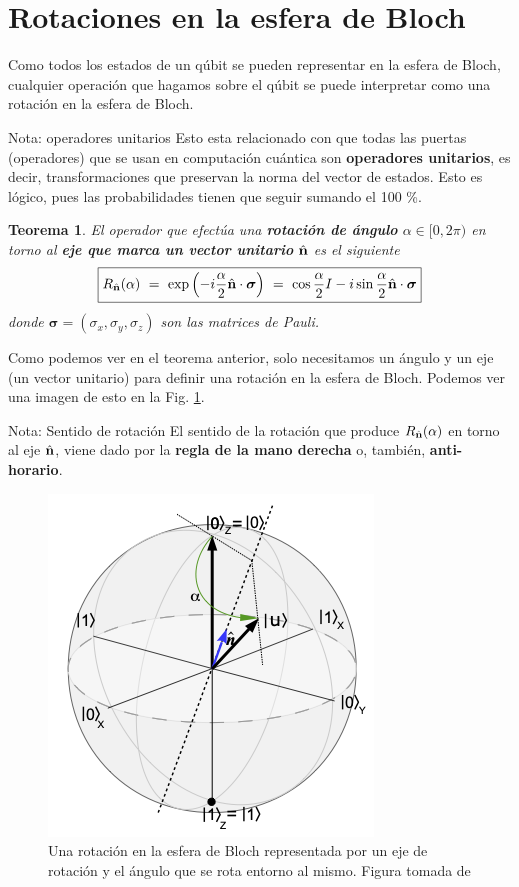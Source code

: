 \documentclass[a4paper,11pt]{book} %
\newtheorem{teorema_contador}{Teorema}
\newcommand{\Teorema}[1]{
		\begin{mybox_gray2}{}
			\begin{teorema_contador}
				 #1 
			\end{teorema_contador} 
		\end{mybox_gray2}
	}
\numberwithin{equation}{chapter}
\begin{document}
    \section{Rotaciones en la esfera de Bloch}

Como todos los estados de un qúbit se pueden representar en la esfera de Bloch, cualquier operación que hagamos sobre el qúbit se puede interpretar como una rotación en la esfera de Bloch.

	\begin{mybox_blue}{Nota: operadores unitarios}
	Esto esta relacionado con que todas las puertas (operadores) que se usan en computación cuántica son 
	\textbf{operadores unitarios}, es decir, transformaciones que preservan la norma
	del vector de estados. Esto es lógico, pues las probabilidades tienen que seguir 
	sumando el 100 \%. 
	\end{mybox_blue}
	

	\Teorema{
	El operador que efectúa una \textbf{rotación de ángulo}  $\alpha\in [0,2\pi)$ en torno al 
	\textbf{eje que marca un vector unitario} $\hat{\bf n}$ es el siguiente
	\begin{equation} \label{ec_puertas_simples_Rn}
	\boxed{R_{\hat{\bf n}}(\alpha)~ = ~\exp\left( -i\frac{\alpha}{2} \hat{\bf n}\cdot 
	\boldsymbol{\sigma} \right) ~=~ \cos \frac{\alpha}{2} I - i \sin\frac{\alpha}{2} 
	\hat{\bf n}\cdot\boldsymbol{\sigma} }
	\end{equation}
	donde $\boldsymbol{\sigma} = (\sigma_x, \sigma_y, \sigma_z)$ son las matrices de Pauli.
	}
	
Como podemos ver en el teorema anterior, solo necesitamos un ángulo y un eje (un vector unitario) para definir una rotación en la esfera de Bloch. Podemos ver una imagen de esto en la Fig. \ref{Fig_puertas_simples_BlochSphere_rot.png}. 


	\begin{mybox_blue}{Nota: Sentido de rotación}
	El sentido de la rotación que produce $R_{\hat{\bf n}}(\alpha)$ en torno al eje 
	$\hat{\bf n}$, viene dado por la \textbf{regla de la mano derecha} o, también, 
	\textbf{anti-horario}. 
	\end{mybox_blue}

	\begin{figure}[H]
	\centering 
	\includegraphics[width=0.3\linewidth]{Figuras/Fig_puertas_simples_BlochSphere_rot.png}
	\caption{Una rotación en la esfera de Bloch representada por un eje de rotación y el 
	ángulo que se rota entorno al mismo. Figura tomada de \cite{bib_Curso-JMas}}
	\label{Fig_puertas_simples_BlochSphere_rot.png}
	\end{figure}
\end{document}
